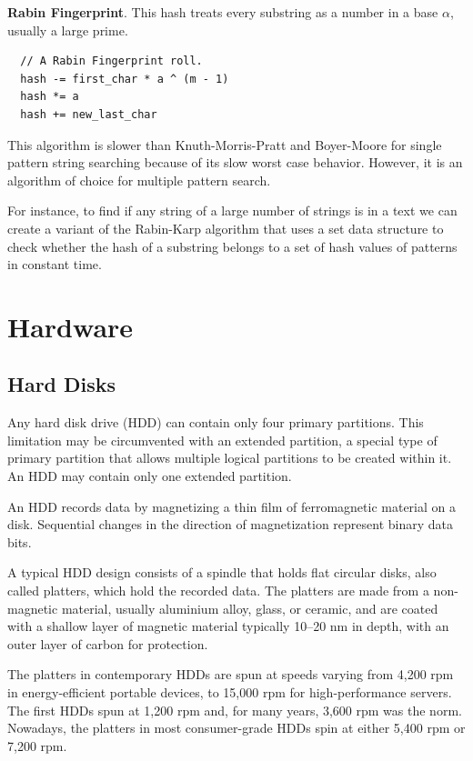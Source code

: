 \documentclass[oneside]{book} %
\theoremstyle{plain}
\begin{document}
\textbf{Rabin Fingerprint}. This hash treats every substring as a number in a
base \(\alpha\), usually a large prime.

\begin{lstlisting}
  // A Rabin Fingerprint roll.
  hash -= first_char * a ^ (m - 1)
  hash *= a
  hash += new_last_char
\end{lstlisting}

This algorithm is slower than Knuth-Morris-Pratt and Boyer-Moore for single
pattern string searching because of its slow worst case behavior. However, it is
an algorithm of choice for multiple pattern search.

For instance, to find if any string of a large number of strings is in a text we
can create a variant of the Rabin-Karp algorithm that uses a set data structure
to check whether the hash of a substring belongs to a set of hash values of
patterns in constant time.


\chapter{Hardware}
\section{Hard Disks}
Any hard disk drive (HDD) can contain only four primary partitions. This
limitation may be circumvented with an extended partition, a special type of
primary partition that allows multiple logical partitions to be created within
it. An HDD may contain only one extended partition.

An HDD records data by magnetizing a thin film of ferromagnetic material on a
disk. Sequential changes in the direction of magnetization represent binary
data bits.

A typical HDD design consists of a spindle that holds flat circular disks, also
called platters, which hold the recorded data. The platters are made from a
non-magnetic material, usually aluminium alloy, glass, or ceramic, and are
coated with a shallow layer of magnetic material typically 10–20 nm in depth,
with an outer layer of carbon for protection.

The platters in contemporary HDDs are spun at speeds varying from 4,200 rpm in
energy-efficient portable devices, to 15,000 rpm for high-performance servers.
The first HDDs spun at 1,200 rpm and, for many years, 3,600 rpm was the norm.
Nowadays, the platters in most consumer-grade HDDs spin at either 5,400 rpm or
7,200 rpm.
\end{document}
